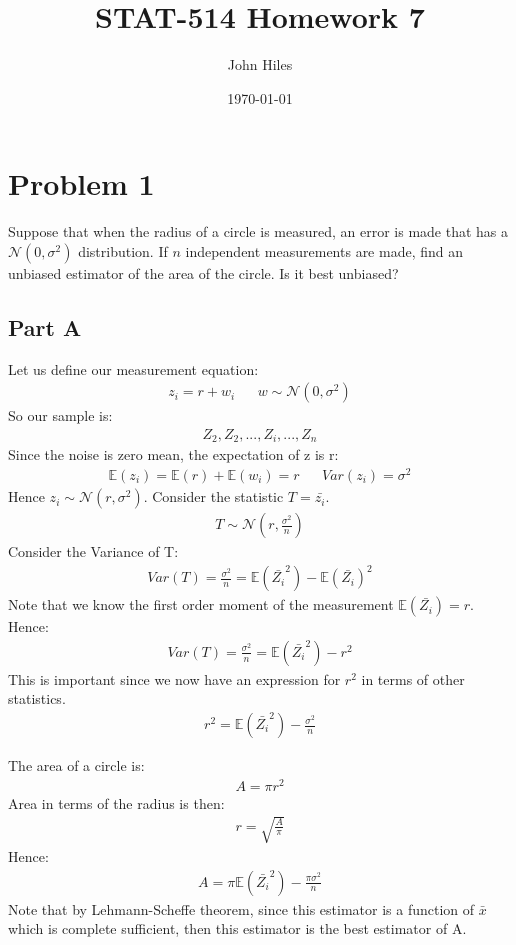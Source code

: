\documentclass{article}
\title{STAT-514 Homework 7}
\author{John Hiles}
\date\today
\begin{document}
\maketitle %

\section*{Problem 1}
Suppose that when the radius of a circle is measured, an error is made that has a $\mathcal{N}(0,\sigma^2)$ distribution. If $n$ independent measurements are made, find an unbiased estimator of the area of the circle. Is it best unbiased?
\subsection*{Part A}
Let us define our measurement equation:
\begin{align*}
z_i = r + w_i && w \sim \mathcal{N}(0,\sigma^2)
\end{align*}
So our sample is:
\begin{align*}
Z_2,Z_2,...,Z_i,...,Z_n
\end{align*}
Since the noise is zero mean, the expectation of z is r:
\begin{align*}
\mathbb{E}(z_i) = \mathbb{E}(r) + \mathbb{E}(w_i) = r && Var(z_i) = \sigma^2
\end{align*}
Hence $z_i \sim \mathcal{N}(r,\sigma^2)$. Consider the statistic $T=\bar{z_i}$.
\begin{align*}
T \sim \mathcal{N}(r,\frac{\sigma^2}{n})
\end{align*}
Consider the Variance of T:
\begin{align*}
Var(T) = \frac{\sigma^2}{n} = \mathbb{E}(\bar{Z_i}^2) - \mathbb{E}(\bar{Z_i})^2
\end{align*}
Note that we know the first order moment of the measurement $\mathbb{E}(\bar{Z_i}) = r$. Hence:
\begin{align*}
Var(T) = \frac{\sigma^2}{n} = \mathbb{E}(\bar{Z_i}^2) - r^2
\end{align*}
This is important since we now have an expression for $r^2$ in terms of other statistics.
\begin{align*}
r^2 = \mathbb{E}(\bar{Z_i}^2) - \frac{\sigma^2}{n}
\end{align*}

The area of a circle is:
\begin{align*}
A = \pi r^2 
\end{align*}
Area in terms of the radius is then:
\begin{align*}
r = \sqrt{\frac{A}{\pi}}
\end{align*}
Hence:
\begin{align*}
\boxed{ A = \pi \mathbb{E}(\bar{Z_i}^2) - \frac{\pi \sigma^2}{n} }
\end{align*}
Note that by Lehmann-Scheffe theorem, since this estimator is a function of $\bar{x}$ which is complete sufficient, then this estimator is the best estimator of A.
\end{document}
